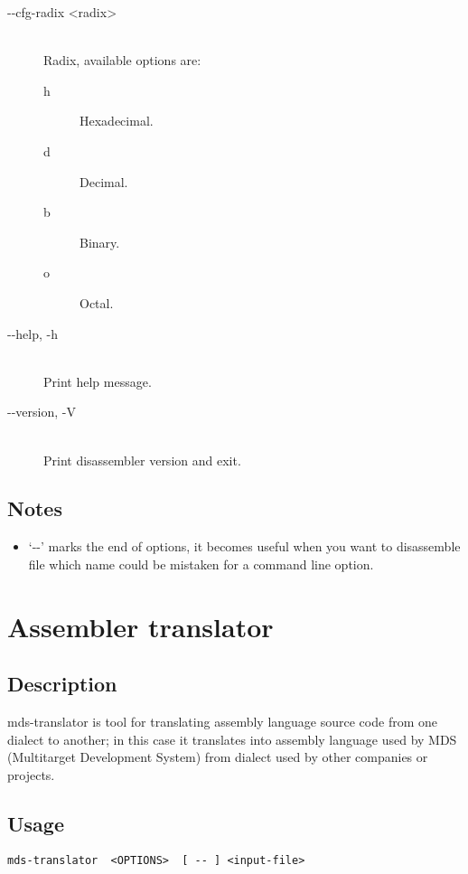 \begin{description}
            \item[-{}-cfg-radix <radix>]~\\
                Radix, available options are:
                \begin{description}
                    \item [h] Hexadecimal.
                    \item [d] Decimal.
                    \item [b] Binary.
                    \item [o] Octal.
                \end{description}

            \item[-{}-help, -h]~\\
                Print help message.

            \item[-{}-version, -V]~\\
                Print disassembler version and exit.
        \end{description}

    \subsection{Notes}
        \begin{itemize}
            \item `-{}-' marks the end of options, it becomes useful when you want to disassemble file which name could be mistaken for a command line option.
        \end{itemize}

\section{Assembler translator}
    \subsection{Description}
        mds-translator is tool for translating assembly language source code from one dialect to another; in this case it translates into assembly language used by MDS (Multitarget Development System) from dialect used by other companies or projects.

    \subsection{Usage}
        \verb'mds-translator  <OPTIONS>  [ -- ] <input-file>'

